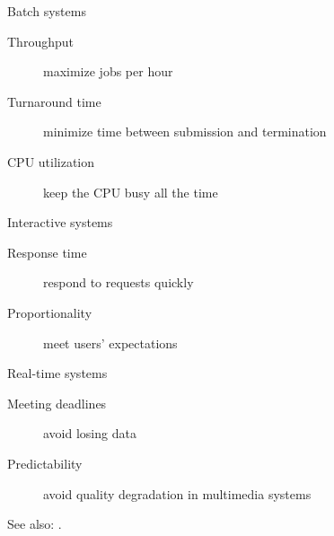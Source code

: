 \begin{frame}
  \begin{block}{Batch systems}
    \begin{description}
    \item[Throughput] maximize jobs per hour
    \item[Turnaround time] minimize time between submission and termination
    \item[CPU utilization] keep the CPU busy all the time
    \end{description}
  \end{block}
  \begin{block}{Interactive systems}
    \begin{description}
    \item[Response time] respond to requests quickly
    \item[Proportionality] meet users' expectations
    \end{description}
  \end{block}
  \begin{block}{Real-time systems}
    \begin{description}
    \item[Meeting deadlines] avoid losing data
    \item[Predictability] avoid quality degradation in multimedia systems
    \end{description}
  \end{block}
\end{frame}

See also: .

